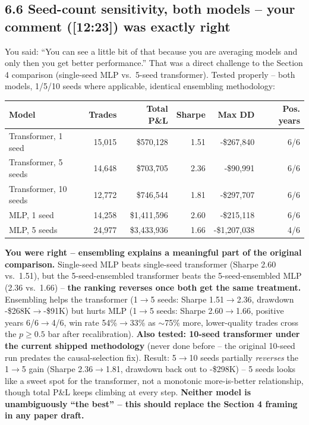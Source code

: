 \documentclass[11pt]{article}
\begin{document}
\subsection*{6.6 Seed-count sensitivity, both models -- your comment ([12:23]) was exactly right}
You said: ``You can see a little bit of that because you are averaging models and only then you get better
performance.'' That was a direct challenge to the Section 4 comparison (single-seed MLP vs.\ 5-seed
transformer). Tested properly -- both models, 1/5/10 seeds where applicable, identical ensembling
methodology:
\begin{table}[H]
\centering
\small
\begin{tabular}{lrrrrr}
\toprule
Model & Trades & Total P\&L & Sharpe & Max DD & Pos. years \\
\midrule
Transformer, 1 seed & 15,015 & \$570,128 & 1.51 & -\$267,840 & 6/6 \\
Transformer, 5 seeds & 14,648 & \$703,705 & 2.36 & -\$90,991 & 6/6 \\
Transformer, 10 seeds & 12,772 & \$746,544 & 1.81 & -\$297,707 & 6/6 \\
MLP, 1 seed & 14,258 & \$1,411,596 & 2.60 & -\$215,118 & 6/6 \\
MLP, 5 seeds & 24,977 & \$3,433,936 & 1.66 & -\$1,207,038 & 4/6 \\
\bottomrule
\end{tabular}
\end{table}
\textbf{You were right -- ensembling explains a meaningful part of the original comparison.} Single-seed
MLP beats single-seed transformer (Sharpe 2.60 vs.\ 1.51), but the 5-seed-ensembled transformer beats the
5-seed-ensembled MLP (2.36 vs.\ 1.66) -- \textbf{the ranking reverses once both get the same treatment.}
Ensembling helps the transformer (1$\to$5 seeds: Sharpe 1.51$\to$2.36, drawdown -\$268K$\to$-\$91K) but
hurts MLP (1$\to$5 seeds: Sharpe 2.60$\to$1.66, positive years 6/6$\to$4/6, win rate 54\%$\to$33\% as
$\sim$75\% more, lower-quality trades cross the $p\ge0.5$ bar after recalibration). \textbf{Also tested:
10-seed transformer under the current shipped methodology} (never done before -- the original 10-seed run
predates the causal-selection fix). Result: 5$\to$10 seeds partially \emph{reverses} the 1$\to$5 gain
(Sharpe 2.36$\to$1.81, drawdown back out to -\$298K) -- 5 seeds looks like a sweet spot for the transformer,
not a monotonic more-is-better relationship, though total P\&L keeps climbing at every step. \textbf{Neither
model is unambiguously ``the best'' -- this should replace the Section 4 framing in any paper draft.}
\end{document}
